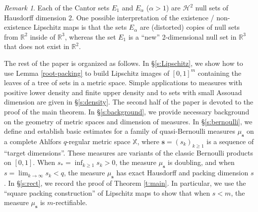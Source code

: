 \documentclass[12pt]{amsart}
\theoremstyle{definition}
\theoremstyle{remark}
\newtheorem{remark}[theorem]{Remark}
\newcommand{\RR}{\mathbb{R}}
\newcommand{\XX}{\mathbb{X}}
\newcommand{\Haus}{\mathcal{H}}
\newcommand{\muse}{\mu_{\mathbf{s}}}
\numberwithin{figure}{section}
\numberwithin{equation}{section}
\begin{document}
\begin{remark}Each of the Cantor sets $E_1$ and $E_\alpha$ ($\alpha>1$) are $\Haus^2$ null sets of Hausdorff dimension 2. One possible interpretation of the existence / non-existence Lipschitz maps is that the sets $E_\alpha$ are (distorted) copies of null sets from $\RR^2$ inside of $\RR^3$, whereas the set $E_1$ is a ``new'' 2-dimensional null set in $\RR^3$ that does not exist in $\RR^2$.  \end{remark}

The rest of the paper is organized as follows. In \S\ref{s:Lipschitz}, we show how to use Lemma \ref{root-packing} to build Lipschitz images of $[0,1]^m$ containing the leaves of a tree of sets in a metric space. Simple applications to measures with positive lower density and finite upper density and to sets with small Assouad dimension are given in \S\ref{s:density}. The second half of the paper is devoted to the proof of the main theorem. In \S\ref{s:background}, we provide necessary background on the geometry of metric spaces and dimension of measures. In \S\ref{s:bernoulli}, we define and establish basic estimates for a family of quasi-Bernoulli measures $\muse$ on a complete Ahlfors $q$-regular metric space $\XX$, where $\mathbf{s}=(s_k)_{k\geq 1}$ is a sequence of ``target dimensions''. These measures are variants of the classic Bernoulli products on $[0,1]$. When $s_*=\inf_{k\geq 1}s_k>0$, the measure $\muse$ is doubling, and when $s=\lim_{k\rightarrow\infty} s_k< q$, the measure $\muse$ has exact Hausdorff and packing dimension $s$. In \S\ref{s:rect}, we record the proof of Theorem \ref{t:main}. In particular, we use the ``square packing construction'' of Lipschitz maps to show that when $s<m$, the measure $\muse$ is $m$-rectifiable.
\end{document}
